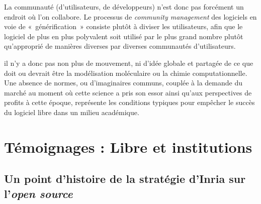 \documentclass{FramateX}
\begin{document}
\begin{refsection}
La communauté (d'utilisateurs, de développeurs)
n'est donc pas forcément un endroit où
l'on collabore. Le processus de \textit{community
management} des logiciels en voie de «~générification~» consiste
plutôt à diviser les utilisateurs, afin que le logiciel de plus en plus
polyvalent soit utilisé par le plus grand nombre plutôt
qu'approprié de manières diverses par diverses
communautés d'utilisateurs.

il n'y a donc pas non plus de mouvement, ni
d'idée globale et partagée de ce que doit ou devrait
être la modélisation moléculaire ou la chimie computationnelle. Une
absence de normes, ou d'imaginaires communs, couplée à
la demande du marché au moment où cette science a pris son essor ainsi
qu'aux perspectives de profits à cette époque,
représente les conditions typiques pour empêcher le succès du logiciel
libre dans un milieu académique.









\printbibliography[heading=subbibliography]
\end{refsection}





%
%
\part{Témoignages : Libre et institutions}
%
%

\chapter*{Un point d'histoire de la stratégie d'Inria sur l'\textit{open source}} 
{}
\end{document}
